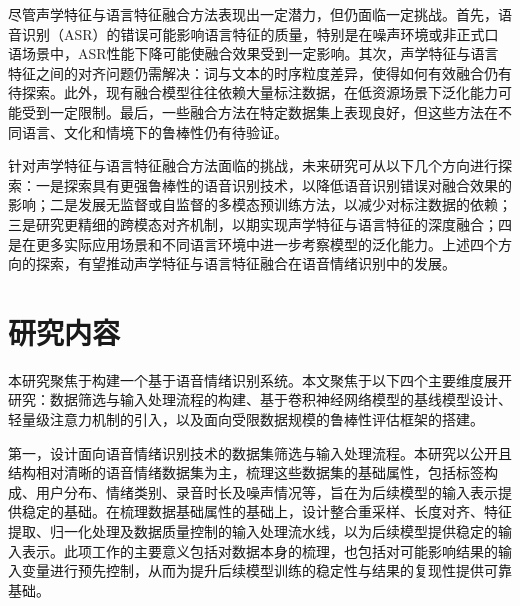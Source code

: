 尽管声学特征与语言特征融合方法表现出一定潜力，但仍面临一定挑战。首先，语音识别（ASR）的错误可能影响语言特征的质量，特别是在噪声环境或非正式口语场景中，ASR性能下降可能使融合效果受到一定影响\cite{li2023asrintegration,sun2023auxiliarytasks}。其次，声学特征与语言特征之间的对齐问题仍需解决：词与文本的时序粒度差异，使得如何有效融合仍有待探索\cite{lee2020crossattention,kim2023focusattention,shou2026comprehensive}。此外，现有融合模型往往依赖大量标注数据，在低资源场景下泛化能力可能受到一定限制\cite{raamkumar2023empathetic}。最后，一些融合方法在特定数据集上表现良好，但这些方法在不同语言、文化和情境下的鲁棒性仍有待验证\cite{zaidi2023dualattention,luna2022auraltransformers}。

针对声学特征与语言特征融合方法面临的挑战，未来研究可从以下几个方向进行探索：一是探索具有更强鲁棒性的语音识别技术，以降低语音识别错误对融合效果的影响；二是发展无监督或自监督的多模态预训练方法，以减少对标注数据的依赖；三是研究更精细的跨模态对齐机制，以期实现声学特征与语言特征的深度融合；四是在更多实际应用场景和不同语言环境中进一步考察模型的泛化能力。上述四个方向的探索，有望推动声学特征与语言特征融合在语音情绪识别中的发展\cite{sun2023auxiliarytasks,zaidi2023dualattention,shou2026comprehensive,raamkumar2023empathetic}。








\section{研究内容}

本研究聚焦于构建一个基于语音情绪识别系统。本文聚焦于以下四个主要维度展开研究：数据筛选与输入处理流程的构建、基于卷积神经网络模型的基线模型设计、轻量级注意力机制的引入，以及面向受限数据规模的鲁棒性评估框架的搭建。

第一，设计面向语音情绪识别技术的数据集筛选与输入处理流程。本研究以公开且结构相对清晰的语音情绪数据集为主，梳理这些数据集的基础属性，包括标签构成、用户分布、情绪类别、录音时长及噪声情况等，旨在为后续模型的输入表示提供稳定的基础。在梳理数据基础属性的基础上，设计整合重采样、长度对齐、特征提取、归一化处理及数据质量控制的输入处理流水线，以为后续模型提供稳定的输入表示。此项工作的主要意义包括对数据本身的梳理，也包括对可能影响结果的输入变量进行预先控制，从而为提升后续模型训练的稳定性与结果的复现性提供可靠基础。

